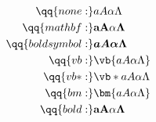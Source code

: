 \begin{align*}
	\qq{none:}	&aA\alpha\Lambda \\
	\qq{mathbf:} &\mathbf{aA\alpha\Lambda} \\
	\qq{boldsymbol:} &\boldsymbol{aA\alpha\Lambda} \\
	\qq{vb:} &\vb{aA\alpha\Lambda} \\
	\qq{vb*:} &\vb*{aA\alpha\Lambda} \\
	\qq{bm:} &\bm{aA\alpha\Lambda} \\
	\qq{bold:} &\bold{aA\alpha\Lambda} \\
\end{align*}